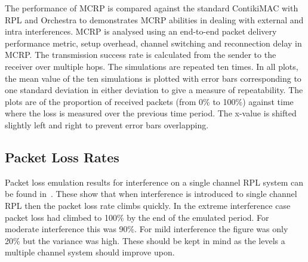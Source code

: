 The performance of MCRP is compared against the standard ContikiMAC with RPL and Orchestra to demonstrates MCRP abilities in dealing with external and intra interferences. 
MCRP is analysed using an end-to-end packet delivery performance metric, setup overhead, channel switching and reconnection delay in MCRP. The transmission success rate is calculated from the sender to the receiver over multiple hops. 
The simulations are repeated ten times. In all plots, the mean value of the ten simulations is plotted with error bars corresponding to one standard deviation in either deviation to give a measure of repeatability. The plots are of the proportion of received packets (from 0\% to 100\%) against time where the loss is measured over the previous time period.  The x-value is shifted slightly left and right to prevent error bars overlapping.

\subsection{Packet Loss Rates}



Packet loss emulation results for interference on a single channel RPL system can be found in~\cite{mcrp}. These show that when interference is introduced to single channel RPL then the packet loss rate climbs quickly.  In the extreme interference case packet loss had climbed to 100\% by the end of the emulated period. For moderate interference this was 90\%.  For mild interference the figure was only 20\% but the variance was high.  These should be kept in mind as the levels a multiple channel system should improve upon.

